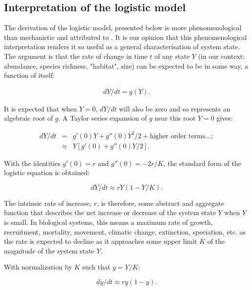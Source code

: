 \documentclass[letterpaper,portrait,11pt]{scrartcl}
\numberwithin{equation}{section}    %
\numberwithin{figure}{section}    %
\numberwithin{table}{section}       %
\begin{document}
\begin{appendices}
\section{Interpretation of the logistic model}
\label{sec:logisticModel}

The derivation of the logistic model, presented below is more phenomenological than mechanistic and attributed to \textcite{lotka1925}. It is our opinion that this phenomenological interpretation renders it so useful as a general characterisation of system state. The argument is that the rate of change in time $t$ of any state $Y$ (in our context: abundance, species richness, "habitat", size) can be expected to be in some way, a function of itself:

\begin{eqnarray}
\label{eqLogisticContinuous}
dY / dt = g(Y).
\end{eqnarray}

It is expected that when $Y = 0$, $dY/dt$ will also be zero and so represents an algebraic root of $g$. A Taylor series expansion of $g$ near this root $Y=0$ gives:

\begin{eqnarray*}
  \label{eqLogisticTaylorSeries}
  dY / dt &=&  g'(0) Y + g''(0) Y^{2}/2  + \text{higher order terms} \dots; \\
  &\approx& Y [g'(0) + g''(0) Y/2  ].
\end{eqnarray*}


With the identities $g'(0) = r$  and $g''(0) = - 2r/K$, the standard form of the logistic equation is obtained:

\begin{equation}
\label{eqLogistic}
dY/dt \approx r Y (1 - Y/K).
\end{equation}

The intrinsic rate of increase, $r$, is therefore, some abstract and aggregate function that describes the net increase or decrease of the system state $Y$ when $Y$ is small. In biological systems, this means a maximum rate of growth, recruitment, mortality, movement, climatic change, extinction, speciation, etc. as the rate is expected to decline as it approaches some upper limit $K$ of the magnitude of the system state $Y$.

With normalization by $K$ such that $ y = Y/K $:

\begin{equation}
\label{eqLogisticBasic}
dy/dt  \approx  r y (1 - y).
\end{equation}


\end{appendices}
\end{document}
